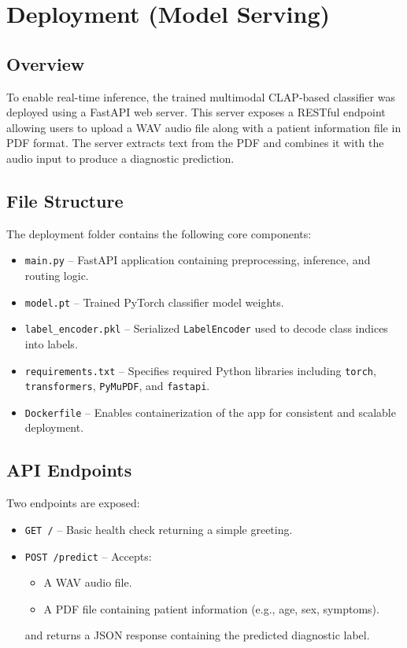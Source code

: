 \section{Deployment (Model Serving)}

\subsection{Overview}
To enable real-time inference, the trained multimodal CLAP-based classifier was deployed using a FastAPI web server. This server exposes a RESTful endpoint allowing users to upload a WAV audio file along with a patient information file in PDF format. The server extracts text from the PDF and combines it with the audio input to produce a diagnostic prediction.

\subsection{File Structure}
The deployment folder contains the following core components:

\begin{itemize}
    \item \texttt{main.py} – FastAPI application containing preprocessing, inference, and routing logic.
    \item \texttt{model.pt} – Trained PyTorch classifier model weights.
    \item \texttt{label\_encoder.pkl} – Serialized \texttt{LabelEncoder} used to decode class indices into labels.
    \item \texttt{requirements.txt} – Specifies required Python libraries including \texttt{torch}, \texttt{transformers}, \texttt{PyMuPDF}, and \texttt{fastapi}.
    \item \texttt{Dockerfile} – Enables containerization of the app for consistent and scalable deployment.
\end{itemize}

\subsection{API Endpoints}
Two endpoints are exposed:
\begin{itemize}
    \item \texttt{GET /} – Basic health check returning a simple greeting.
    \item \texttt{POST /predict} – Accepts:
    \begin{itemize}
        \item A WAV audio file.
        \item A PDF file containing patient information (e.g., age, sex, symptoms).
    \end{itemize}
    and returns a JSON response containing the predicted diagnostic label.
\end{itemize}

